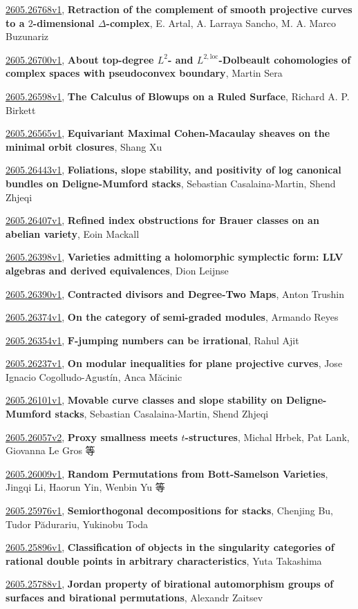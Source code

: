 \documentclass[9pt, a4paper]{article}
\theoremstyle{plain}
\theoremstyle{definition}
\theoremstyle{remark}
\newcommand{\arxiv}[3]{\href{https://arxiv.org/abs/#1}{#1}, \textbf{\textcolor{arxivblue}{#2}}, #3}
\begin{document}
\arxiv{2605.26768v1}{Retraction of the complement of smooth projective curves to a $2$-dimensional $Δ$-complex}{E. Artal, A. Larraya Sancho, M. A. Marco Buzunariz}

\arxiv{2605.26700v1}{About top-degree $L^2$- and $L^{2,\mathrm{loc}}$-Dolbeault cohomologies of complex spaces with pseudoconvex boundary}{Martin Sera}

\arxiv{2605.26598v1}{The Calculus of Blowups on a Ruled Surface}{Richard A. P. Birkett}

\arxiv{2605.26565v1}{Equivariant Maximal Cohen-Macaulay sheaves on the minimal orbit closures}{Shang Xu}

\arxiv{2605.26443v1}{Foliations, slope stability, and positivity of log canonical bundles on Deligne-Mumford stacks}{Sebastian Casalaina-Martin, Shend Zhjeqi}

\arxiv{2605.26407v1}{Refined index obstructions for Brauer classes on an abelian variety}{Eoin Mackall}

\arxiv{2605.26398v1}{Varieties admitting a holomorphic symplectic form: LLV algebras and derived equivalences}{Dion Leijnse}

\arxiv{2605.26390v1}{Contracted divisors and Degree-Two Maps}{Anton Trushin}

\arxiv{2605.26374v1}{On the category of semi-graded modules}{Armando Reyes}

\arxiv{2605.26354v1}{$\mathbf{F}$-jumping numbers can be irrational}{Rahul Ajit}

\arxiv{2605.26237v1}{On modular inequalities for plane projective curves}{Jose Ignacio Cogolludo-Agustín, Anca Măcinic}

\arxiv{2605.26101v1}{Movable curve classes and slope stability on Deligne-Mumford stacks}{Sebastian Casalaina-Martin, Shend Zhjeqi}

\arxiv{2605.26057v2}{Proxy smallness meets $t$-structures}{Michal Hrbek, Pat Lank, Giovanna Le Gros 等}

\arxiv{2605.26009v1}{Random Permutations from Bott-Samelson Varieties}{Jingqi Li, Haorun Yin, Wenbin Yu 等}

\arxiv{2605.25976v1}{Semiorthogonal decompositions for stacks}{Chenjing Bu, Tudor Pădurariu, Yukinobu Toda}

\arxiv{2605.25896v1}{Classification of objects in the singularity categories of rational double points in arbitrary characteristics}{Yuta Takashima}

\arxiv{2605.25788v1}{Jordan property of birational automorphism groups of surfaces and birational permutations}{Alexandr Zaitsev}
\end{document}

